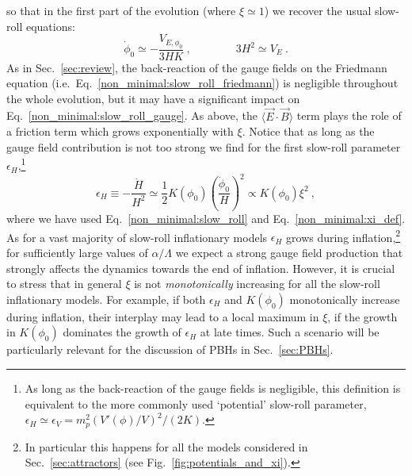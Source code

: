 so that in the first part of the evolution (where $\xi \simeq 1$) we recover the usual slow-roll equations:
\begin{equation}
	\label{non_minimal:slow_roll}
	\dot{\phi}_0 \simeq - \frac{V_{E,\phi_0}}{3 H K} \ , \qquad \qquad 3 H^2 \simeq V_E \ .
\end{equation}
As in Sec.~\ref{sec:review}, the back-reaction of the gauge fields on the Friedmann equation (i.e.\ Eq.~\eqref{non_minimal:slow_roll_friedmann}) is negligible throughout the whole evolution, but it may have a significant impact on Eq.~\eqref{non_minimal:slow_roll_gauge}. As above, the $\langle \vec{E}\cdot \vec{B} \rangle$ term plays the role of a friction term which grows exponentially with $\xi$. Notice that as long as the gauge field contribution is not too strong we find for the first slow-roll parameter $\epsilon_H$,\footnote{As long as the back-reaction of the gauge fields is negligible, this definition is equivalent to the more commonly used `potential' slow-roll parameter, $\epsilon_H \simeq \epsilon_V = m_p^2 (V'(\phi)/V)^2/(2 K)$.}
\begin{equation}
	\label{non_minimal:epsilon_H}
	\epsilon_H \equiv -\frac{\dot{H}}{H^2} \simeq \frac{1}{2} K(\phi_0) \left( \frac{\dot{\phi}_0}{H} \right)^2 \propto K(\phi_0) \xi^2 \ ,
\end{equation}
where we have used Eq.~\eqref{non_minimal:slow_roll} and Eq.~\eqref{non_minimal:xi_def}. As for a vast majority of slow-roll inflationary models $\epsilon_H$ grows during inflation,\footnote{In particular this happens for 
all the models considered in Sec.~\ref{sec:attractors} (see Fig.~\ref{fig:potentials_and_xi}).} for sufficiently large values of $\alpha/\Lambda$ we expect a strong gauge field production that strongly affects the dynamics towards the end of inflation. However, it is crucial to stress that in general $\xi$ is not \emph{monotonically} increasing for all the slow-roll inflationary models. For example, if both  $\epsilon_H$ and $K(\phi_0)$ monotonically increase during inflation, their interplay may lead to a local maximum in $\xi$, if the growth in $K(\phi_0)$ dominates the growth of $\epsilon_H$ at late times. Such a scenario will be particularly relevant for the discussion of PBHs in Sec.~\ref{sec:PBHs}. 

